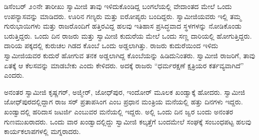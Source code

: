  ಡಿಸೆಂಬರ್ ೨೦ನೇ ತಾರೀಖು ಸ್ವಾಮೀಜಿ ತಾವು ಇಳಿದುಕೊಂಡಿದ್ದ ಬಂಗಲೆಯಲ್ಲಿ ವೇದಾಂತದ ಮೇಲೆ ಒಂದು ಉಪನ್ಯಾಸವನ್ನು ಮಾಡಿದರು. ಊರಿನ ಗಣ್ಯರು ಮತ್ತು ಐರೋಪ್ಯರು ಬಂದಿದ್ದರು. ಸ್ವಾಮೀಜಿಯವರು ಇಲ್ಲಿ ತಮ್ಮ ಗುರುಭಾಯಿಗಳು ಮತ್ತು ರಾಜರೊಂದಿಗೆ ಹತ್ತಿರವಿದ್ದ ಹಲವು ಇತಿಹಾಸ ಪ್ರಸಿದ್ಧವಾದ ಸ್ಥಳಗಳನ್ನು ನೋಡಿಕೊಂಡು ಬರುತ್ತಿದ್ದರು. ಒಂದು ದಿನ ರಾಜರು ಮತ್ತು ಸ್ವಾಮೀಜಿ ಕುದುರೆಯ ಮೇಲೆ ಒಂದು ಸಣ್ಣ ದಾರಿಯಲ್ಲಿ ಹೋಗುತ್ತಿದ್ದರು. ದಾರಿಯ ಪಕ್ಕದಲ್ಲಿ ಕುರುಚಲ ಗಿಡದ ಕೊಂಬೆ ಒಂದು ಅಡ್ಡಲಾಗಿತ್ತು. ರಾಜರು ಕುದುರೆಯಿಂದ ಇಳಿದು ಸ್ವಾಮೀಜಿಯವರ ಕುದುರೆ ಹೋಗುವ ತನಕ ಅಡ್ಡಲಾಗಿದ್ದ ಕೊಂಬೆಯನ್ನು ಹಿಡಿದುನಿಂತರು. ಸ್ವಾಮೀಜಿ ರಾಜರಿಗೆ, ತಾವು ಏತಕ್ಕೆ ಆ ಕೆಲಸವನ್ನು ಮಾಡಬೇಕು ಎಂದು ಕೇಳಿದರು. ಅದಕ್ಕೆ ರಾಜರು “ಧರ್ಮರಕ್ಷಣೆ ಕ್ಷತ್ರಿಯರ ಕರ್ತವ್ಯವಾಗಿದೆ” ಎಂದರು. 

 ಅನಂತರ ಸ್ವಾಮೀಜಿ ಕೃಷ್ಣಗರ್, ಅಜ್ಮೀರ್, ಜೋಧ್‍ಪುರ, ಇಂದೋರ್ ಮೂಲಕ ಖಂಡ್ವಾಕ್ಕೆ ಹೋದರು. ಸ್ವಾಮೀಜಿ ಜೋಧ್‍ಪುರದಲ್ಲಿದ್ದಾಗ ರಾಜ ಸರ್ ಪ್ರತಾಪಸಿಂಗ ಎಂಬ ಪ್ರಧಾನ ಮಂತ್ರಿಯ ಮನೆಯಲ್ಲಿ ಹತ್ತು ದಿನಗಳು ಇದ್ದರು. ಖಂಡ್ವಾದಲ್ಲಿ ಹರಿದಾಸ ಜಟರ್ಜಿ ಎಂಬುವರ ಮನೆಯಲ್ಲಿ ಇದ್ದರು. ಅಲ್ಲಿ ಒಂದು ದಿನ ಜ್ವರ ಬಂದು ಅನಂತರ ಗುಣಮುಖರಾದರು. ಒಂದು ವಾರ ಖಂಡ್ವಾದಲ್ಲಿದ್ದು ಸ್ವಾಮೀಜಿ ಕಲ್ಕತ್ತೆಗೆ ಬಂದಮೇಲೆ ಸಂಘಕ್ಕೆ ಸಂಬಂಧಪಟ್ಟ ಹಲವು ಕಾರ್ಯಕಲಾಪಗಳಲ್ಲಿ ಮಗ್ನರಾದರು. 

